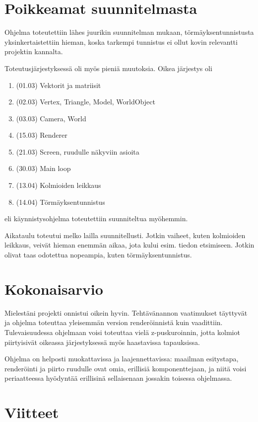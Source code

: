 \documentclass[12pt] {article}
\begin{document}
\section {Poikkeamat suunnitelmasta}

Ohjelma toteutettiin lähes juurikin suunnitelman mukaan, törmäyksentunnistusta yksinkertaistettiin hieman, koska tarkempi tunnistus ei ollut kovin relevantti projektin kannalta.

Toteutusjärjestyksessä oli myös pieniä muutoksia. Oikea järjestys oli

\begin{enumerate}
	\item (01.03) Vektorit ja matriisit
	\item (02.03) Vertex, Triangle, Model, WorldObject
	\item (03.03) Camera, World
	\item (15.03) Renderer
	\item (21.03) Screen, ruudulle näkyviin asioita
	\item (30.03) Main loop
	\item (13.04) Kolmioiden leikkaus
	\item (14.04) Törmäyksentunnistus
\end{enumerate}

eli käynnistysohjelma toteutettiin suunniteltua myöhemmin.

Aikataulu toteutui melko lailla suunnitellusti. Jotkin vaiheet, kuten kolmioiden leikkaus, veivät hieman enemmän aikaa, jota kului esim. tiedon etsimiseen. Jotkin olivat taas odotettua nopeampia, kuten törmäyksentunnistus.

\section {Kokonaisarvio}

Mielestäni projekti onnistui oikein hyvin. Tehtävänannon vaatimukset täyttyvät ja ohjelma toteuttaa yleisemmän version renderöinnistä kuin vaadittiin. Tulevaisuudessa ohjelmaan voisi toteuttaa vielä z-puskuroinnin, jotta kolmiot piirtyisivät oikeassa järjestyksessä myös haastavissa tapauksissa.

Ohjelma on helposti muokattavissa ja laajennettavissa: maailman esitystapa, renderöinti ja piirto ruudulle ovat omia, erillisiä komponenttejaan, ja niitä voisi periaatteessa hyödyntää erillisinä sellaisenaan jossakin toisessa ohjelmassa.

\section {Viitteet}
\end{document}
